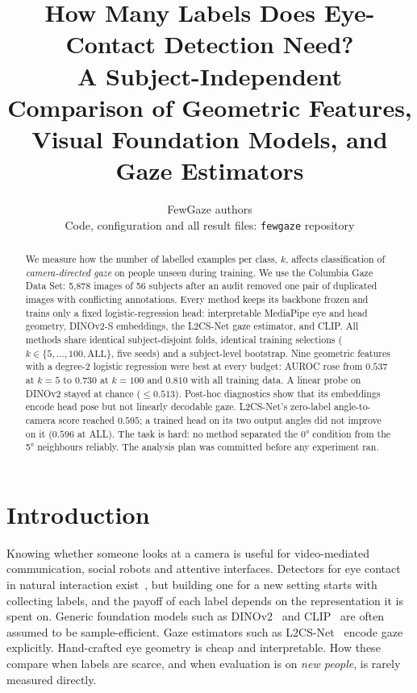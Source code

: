 \documentclass[10pt,twocolumn]{article}
\title{\Large\bfseries How Many Labels Does Eye-Contact Detection Need?\\
A Subject-Independent Comparison of Geometric Features,\\ Visual Foundation Models, and Gaze Estimators}
\author{FewGaze authors\\\small Code, configuration and all result files: \texttt{fewgaze} repository}
\date{}
\begin{document}
\maketitle

\begin{abstract}
\noindent
We measure how the number of labelled examples per class, $k$, affects classification of
\emph{camera-directed gaze} on people unseen during training. We use the Columbia Gaze Data Set:
5{,}878 images of 56 subjects after an audit removed one pair of duplicated images with conflicting
annotations. Every method keeps its backbone frozen and trains only a fixed logistic-regression head:
interpretable MediaPipe eye and head geometry, DINOv2-S embeddings, the L2CS-Net gaze estimator,
and CLIP. All methods share identical subject-disjoint folds, identical training selections
($k\in\{5,\dots,100,\text{ALL}\}$, five seeds) and a subject-level bootstrap.
Nine geometric features with a degree-2 logistic regression were best at every budget:
AUROC rose from $0.537$ at $k{=}5$ to $0.730$ at $k{=}100$ and $0.810$ with all training data.
A linear probe on DINOv2 stayed at chance ($\le0.513$). Post-hoc diagnostics show that its embeddings
encode head pose but not linearly decodable gaze.
L2CS-Net's zero-label angle-to-camera score reached $0.595$; a trained head on its two output angles
did not improve on it ($0.596$ at ALL). The task is hard: no method separated the 0° condition from the 5° neighbours
reliably. The analysis plan was committed before any experiment ran.
\end{abstract}

\section{Introduction}
Knowing whether someone looks at a camera is useful for video-mediated communication, social robots
and attentive interfaces. Detectors for eye contact in natural interaction exist~\cite{muller2018robust,zhang2017everyday},
but building one for a new setting starts with collecting labels, and the payoff of each label depends on the
representation it is spent on. Generic foundation models such as DINOv2~\cite{oquab2024dinov2} and
CLIP~\cite{radford2021clip} are often assumed to be sample-efficient. Gaze estimators such as
L2CS-Net~\cite{abdelrahman2023l2cs} encode gaze explicitly. Hand-crafted eye geometry is cheap and interpretable.
How these compare when labels are scarce, and when evaluation is on \emph{new people}, is rarely
measured directly.
\end{document}
